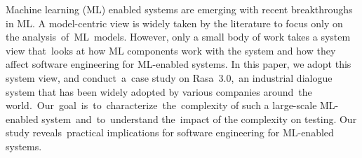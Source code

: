 Machine learning (ML) enabled systems are emerging with recent breakthroughs in ML. A model-centric view is widely taken by the literature to focus only on the analysis~of~ML~models. However, only a small body of work takes a system view that~looks at how ML components work with the system and how they affect software engineering for ML-enabled systems. In this paper, we adopt this system view, and conduct~a~case study on Rasa~3.0,~an industrial dialogue system that has been widely adopted by various companies around~the world.~Our~goal~is~to~characterize~the~complexity of such a large-scale ML-enabled system~and~to~understand the~impact of the complexity on testing. Our study reveals~practical implications for software engineering for ML-enabled systems. 